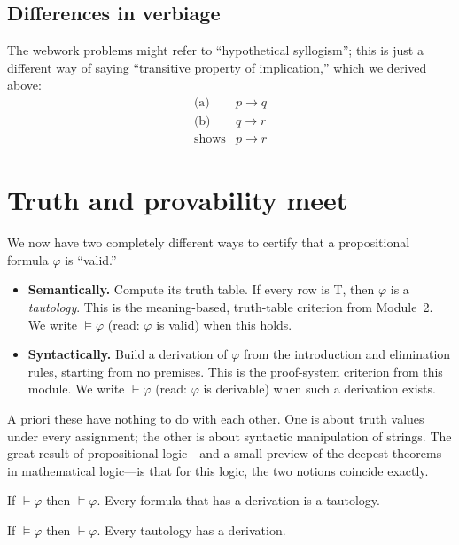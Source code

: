 \documentclass[11pt]{article}
\begin{document}
\subsection{Differences in verbiage}

The webwork problems might refer to ``hypothetical syllogism''; this is just a different way of saying ``transitive property of implication,'' which we derived above:
\[
  \begin{array}{rl}
    \text{(a)} & p \to q \\
    \text{(b)} & q \to r \\
    \hline
    \text{shows} & p \to r
  \end{array}
\]

\section{Truth and provability meet}

We now have two completely different ways to certify that a propositional formula $\varphi$ is ``valid.''

\begin{itemize}
  \item \textbf{Semantically.} Compute its truth table. If every row is T, then $\varphi$ is a \emph{tautology}. This is the meaning-based, truth-table criterion from Module~2. We write $\models \varphi$ (read: $\varphi$ is valid) when this holds.
  \item \textbf{Syntactically.} Build a derivation of $\varphi$ from the introduction and elimination rules, starting from no premises. This is the proof-system criterion from this module. We write $\vdash \varphi$ (read: $\varphi$ is derivable) when such a derivation exists.
\end{itemize}

A priori these have nothing to do with each other. One is about truth values under every assignment; the other is about syntactic manipulation of strings. The great result of propositional logic---and a small preview of the deepest theorems in mathematical logic---is that for this logic, the two notions coincide exactly.

\begin{theorem}[Soundness]
If $\vdash \varphi$ then $\models \varphi$. Every formula that has a derivation is a tautology.
\end{theorem}

\begin{theorem}[Completeness]
If $\models \varphi$ then $\vdash \varphi$. Every tautology has a derivation.
\end{theorem}
\end{document}

